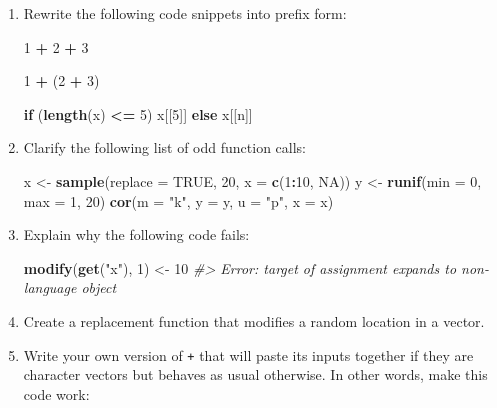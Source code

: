 \documentclass[]{book}
\newenvironment{Shaded}{\begin{snugshade}}{\end{snugshade}}
\newcommand{\CommentTok}[1]{\textcolor[rgb]{0.56,0.35,0.01}{\textit{#1}}}
\newcommand{\ControlFlowTok}[1]{\textcolor[rgb]{0.13,0.29,0.53}{\textbf{#1}}}
\newcommand{\DataTypeTok}[1]{\textcolor[rgb]{0.13,0.29,0.53}{#1}}
\newcommand{\DecValTok}[1]{\textcolor[rgb]{0.00,0.00,0.81}{#1}}
\newcommand{\KeywordTok}[1]{\textcolor[rgb]{0.13,0.29,0.53}{\textbf{#1}}}
\newcommand{\NormalTok}[1]{#1}
\newcommand{\OperatorTok}[1]{\textcolor[rgb]{0.81,0.36,0.00}{\textbf{#1}}}
\newcommand{\OtherTok}[1]{\textcolor[rgb]{0.56,0.35,0.01}{#1}}
\newcommand{\StringTok}[1]{\textcolor[rgb]{0.31,0.60,0.02}{#1}}
\theoremstyle{definition}
\theoremstyle{definition}
\theoremstyle{definition}
\theoremstyle{remark}
\begin{document}
\begin{enumerate}
\def\labelenumi{\arabic{enumi}.}
\item
  Rewrite the following code snippets into prefix form:

\begin{Shaded}
\begin{Highlighting}[]
\DecValTok{1} \OperatorTok{+}\StringTok{ }\DecValTok{2} \OperatorTok{+}\StringTok{ }\DecValTok{3}

\DecValTok{1} \OperatorTok{+}\StringTok{ }\NormalTok{(}\DecValTok{2} \OperatorTok{+}\StringTok{ }\DecValTok{3}\NormalTok{)}

\ControlFlowTok{if}\NormalTok{ (}\KeywordTok{length}\NormalTok{(x) }\OperatorTok{<=}\StringTok{ }\DecValTok{5}\NormalTok{) x[[}\DecValTok{5}\NormalTok{]] }\ControlFlowTok{else}\NormalTok{ x[[n]]}
\end{Highlighting}
\end{Shaded}
\item
  Clarify the following list of odd function calls:

\begin{Shaded}
\begin{Highlighting}[]
\NormalTok{x <-}\StringTok{ }\KeywordTok{sample}\NormalTok{(}\DataTypeTok{replace =} \OtherTok{TRUE}\NormalTok{, }\DecValTok{20}\NormalTok{, }\DataTypeTok{x =} \KeywordTok{c}\NormalTok{(}\DecValTok{1}\OperatorTok{:}\DecValTok{10}\NormalTok{, }\OtherTok{NA}\NormalTok{))}
\NormalTok{y <-}\StringTok{ }\KeywordTok{runif}\NormalTok{(}\DataTypeTok{min =} \DecValTok{0}\NormalTok{, }\DataTypeTok{max =} \DecValTok{1}\NormalTok{, }\DecValTok{20}\NormalTok{)}
\KeywordTok{cor}\NormalTok{(}\DataTypeTok{m =} \StringTok{"k"}\NormalTok{, }\DataTypeTok{y =}\NormalTok{ y, }\DataTypeTok{u =} \StringTok{"p"}\NormalTok{, }\DataTypeTok{x =}\NormalTok{ x)}
\end{Highlighting}
\end{Shaded}
\item
  Explain why the following code fails:

\begin{Shaded}
\begin{Highlighting}[]
\KeywordTok{modify}\NormalTok{(}\KeywordTok{get}\NormalTok{(}\StringTok{"x"}\NormalTok{), }\DecValTok{1}\NormalTok{) <-}\StringTok{ }\DecValTok{10}
\CommentTok{#> Error: target of assignment expands to non-language object}
\end{Highlighting}
\end{Shaded}
\item
  Create a replacement function that modifies a random location in a
  vector.
\item
  Write your own version of \texttt{+} that will paste its inputs
  together if they are character vectors but behaves as usual otherwise.
  In other words, make this code work:


\end{enumerate}
\end{document}
